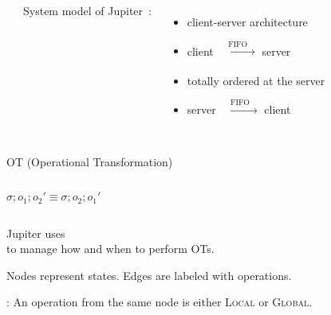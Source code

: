 
\begin{frame}{}
  \centerline{\Huge {}}
\end{frame}

\begin{frame}{}
  \begin{columns}
      \begin{center}
	
      \end{center}
      System model of Jupiter~: \\[5pt]
      \begin{itemize}
	\setlength{\itemsep}{10pt}
	\item<1-> client-server architecture
	\item<2-> client $\xrightarrow[]{\quad \text{FIFO} \quad}$ server
	\item<3-> totally ordered at the server
	\item<4-> server $\xrightarrow[]{\quad \text{FIFO} \quad}$ client
      \end{itemize}
  \end{columns}
\end{frame}

\begin{frame}{}
  \centerline{OT (Operational Transformation)~}

  \begin{columns}[c]
      \pause
      \[
	\sigma; o_1; o_2' \equiv \sigma; o_2; o_1'
      \]
  \end{columns}
\end{frame}

\begin{frame}{}
  \begin{center}
    {\large Jupiter uses ~ \\
    to manage how and when to perform OTs.}
  \end{center}


  \begin{center} 
    \pause
    Nodes represent states. \quad Edges are labeled with operations.

    \pause
    : An operation from the same node is either \textsc{Local} or \textsc{Global}. 
  \end{center}
\end{frame}

